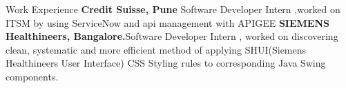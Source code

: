\begin{rubric}{Work Experience}
%
	\textbf{Credit Suisse, Pune} Software Developer Intern ,worked on ITSM by using ServiceNow and api management with APIGEE
%
%
%
	\textbf{SIEMENS Healthineers, Bangalore.}Software Developer Intern , worked on discovering clean, systematic and more efficient method of applying SHUI(Siemens Healthineers User Interface) CSS Styling rules to corresponding Java Swing components. 
%
\end{rubric}